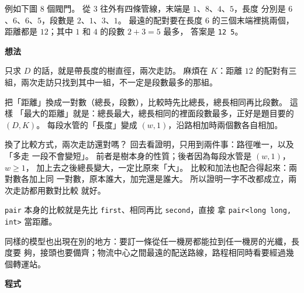 例如下圖 $8$ 個閥門。 從 $3$ 往外有四條管線，末端是 $1$、$8$、$4$、$5$，長度
分別是 $6$、$6$、$6$、$5$，段數是 $2$、$1$、$3$、$1$。 最遠的配對要在長度 $6$
的三個末端裡挑兩個，距離都是 $12$；其中 $1$ 和 $4$ 的段數 $2 + 3 = 5$ 最多，
答案是 \texttt{12 5}。

\begin{center}
\label{fig:tree-pipes}
\end{center}

\textbf{想法}

只求 $D$ 的話，就是帶長度的樹直徑，兩次走訪。 麻煩在 $K$：距離 $12$ 的配對有三
組，兩次走訪只找到其中一組，不一定是段數最多的那組。

把「距離」換成一對數（總長，段數），比較時先比總長，總長相同再比段數。 這樣
「最大的距離」就是：總長最大，總長相同的裡面段數最多，正好是題目要的 $(D, K)$。
每段水管的「長度」變成 $(w, 1)$，沿路相加時兩個數各自相加。

換了比較方式，兩次走訪還對嗎？ 回去看證明，只用到兩件事：路徑唯一，以及「多走
一段不會變短」。 前者是樹本身的性質；後者因為每段水管是 $(w, 1)$，$w \ge 1$，
加上去之後總長變大，一定比原來「大」。 比較和加法也配合得起來：兩對數各加上同
一對數，原本誰大，加完還是誰大。 所以證明一字不改都成立，兩次走訪都用數對比較
就好。

\texttt{pair} 本身的比較就是先比 \texttt{first}、相同再比 \texttt{second}，直接
拿 \texttt{pair<long long, int>} 當距離。

同樣的模型也出現在別的地方：要訂一條從任一機房都能拉到任一機房的光纖，長度要
夠，接頭也要備齊；物流中心之間最遠的配送路線，路程相同時看要經過幾個轉運站。

\textbf{程式}

